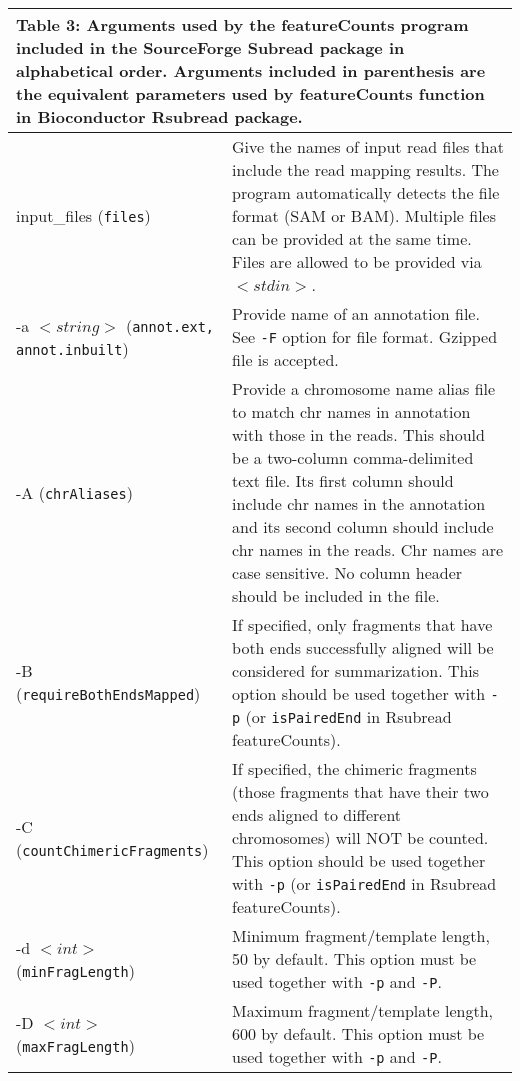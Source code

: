 \documentclass[12pt]{report}
\newcommand{\code}[1]{{\small\texttt{#1}}}
\newcommand{\Subread}{\textsf{Subread}}
\newcommand{\Rsubread}{\textsf{Rsubread}}
\newcommand{\featureCounts}{\textsf{featureCounts}}
\begin{document}
\begin{longtable}{|p{5cm}|p{11cm}|}
\multicolumn{2}{p{16cm}}{Table 3: Arguments used by the {\featureCounts} program included in the SourceForge {\Subread} package in alphabetical order.
Arguments included in parenthesis are the equivalent parameters used by {\featureCounts} function in Bioconductor {\Rsubread} package.}
\endfirsthead
\hline
Arguments & Description \\
\hline
input\_files \newline (\code{files}) & Give the names of input read files that include the read mapping results. The program automatically detects the file format (SAM or BAM). Multiple files can be provided at the same time. Files are allowed to be provided via $<stdin>$. \\
\hline
-a $<string>$ \newline (\code{annot.ext, annot.inbuilt})  & Provide name of an annotation file. See \code{-F} option for file format. Gzipped file is accepted.\\
\hline
-A \newline (\code{chrAliases}) & Provide a chromosome name alias file to match chr names in annotation with those in the reads. This should be a two-column comma-delimited text file. Its first column should include chr names in the annotation and its second column should include chr names in the reads. Chr names are case sensitive. No column header should be included in the file.\\
\hline
-B \newline (\code{requireBothEndsMapped}) & If specified, only fragments that have both ends successfully aligned will be considered for summarization. This option should be used together with \code{-p} (or \code{isPairedEnd} in {\Rsubread} {\featureCounts}).\\
\hline
-C \newline (\code{countChimericFragments}) & If specified, the chimeric fragments (those fragments that have their two ends aligned to different chromosomes) will NOT be counted. This option should be used together with \code{-p} (or \code{isPairedEnd} in {\Rsubread} {\featureCounts}).\\
\hline
-d $<int>$ \newline (\code{minFragLength}) & Minimum fragment/template length, 50 by default. This option must be used together with \code{-p} and \code{-P}.\\
\hline
-D $<int>$ \newline (\code{maxFragLength}) & Maximum fragment/template length, 600 by default. This option must be used together with \code{-p} and \code{-P}.\\

\end{longtable}
\end{document}
